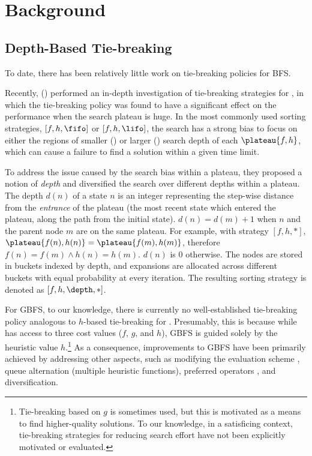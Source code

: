 \section{Background}

\subsection{Depth-Based Tie-breaking}

To date, there has been relatively little work on 
tie-breaking policies for BFS.

Recently, \citeauthor{Asai2016} (\citeyear{Asai2016}) performed an in-depth investigation
of tie-breaking strategies for \astar, in which
the tie-breaking policy was found to have a
significant effect on the performance when the search plateau is huge.
In the most commonly used  sorting strategies, $[f,h,\fifo]$ or $[f,h,\lifo]$, the search has a strong bias to focus on  either the regions of smaller (\fifo) or larger (\lifo) search depth of each $\plateau{f,h}$, which can cause a failure to find a solution within a given time limit.

To address the issue caused by the search bias within a plateau,
they proposed a notion of \emph{depth} and diversified the search over different depths
within a plateau. The depth $d(n)$ of a state $n$ is an integer representing 
the step-wise distance from the \emph{entrance} of the plateau (the most recent state which
entered the plateau, along the path from the initial state). 
% 
$d(n)=d(m)+1$ when $n$ and the parent node $m$ are on the same plateau.
For example, with strategy $[f,h,*]$, 
$\plateau{f(n),h(n)}=\plateau{f(m),h(m)}$, therefore
$f(n) = f(m) \land h(n) = h(m)$.
$d(n)$ is 0 otherwise.
The nodes are stored in buckets indexed by depth, and expansions are allocated across different buckets with equal probability at every iteration.
The resulting sorting strategy is denoted as $[f,h,\depth,*]$.

For GBFS, to our knowledge, there is currently no
well-established tie-breaking policy analogous to $h$-based tie-breaking for \astar.
Presumably, this is  because
while \astar has access to three cost values ($f$, $g$, and $h$),
GBFS is guided solely by the heuristic value $h$.\footnote{Tie-breaking based on  $g$ is sometimes used, but this is motivated as a means to find higher-quality solutions. To our knowledge, in a satisficing context, tie-breaking strategies for reducing search effort have not been explicitly motivated or evaluated.} 
As a consequence,
improvements to  GBFS have been primarily achieved by addressing other aspects, such as
modifying the evaluation scheme \cite[lazy evaluation]{richter2010lama}, queue alternation
(multiple heuristic functions), preferred operators \cite{hoffmann01}, and diversification.

